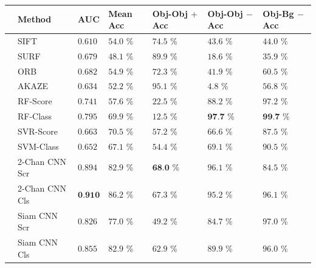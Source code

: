 \begin{table}[t]
	\forcerectofloat
	\centering
	
	\begin{tabular}{lllllll}
		\hline 
		& Method 	& AUC	 	& Mean Acc & Obj-Obj $+$ Acc 	& Obj-Obj $-$ Acc 	& Obj-Bg $-$ Acc\\ 
		\hline 
		& SIFT	& $0.610$ 	& $54.0 $ \% & $74.5 $ \% 		&  $43.6 $ \%			&  $44.0 $ \% \\
		& SURF	& $0.679$	& $48.1 $ \% & $89.9 $ \% 		&  $18.6 $ \%			&  $35.9 $ \% \\
		& ORB	& $0.682$	& $54.9 $ \% & $72.3 $ \% 		&  $41.9 $ \%			&  $60.5 $ \% \\
		& AKAZE	& $0.634$	& $52.2 $ \% & $95.1 $ \% 		&  $4.8 $ \%				&  $56.8 $ \% \\
		\hline
		
		\multirow{6}{*}{\rotatebox{90}{Different}}& RF-Score	& $0.741$	& $57.6 $ \% & $22.5 $ \% 		&  $88.2 $ \%				&  $97.2 $ \% \\
		& RF-Class	& $0.795$	& $69.9 $ \% & $12.5 $ \% 		&  $\textbf{97.7} $ \%				&  $\textbf{99.7} $ \% \\
		\cline{2-7}
		& SVR-Score	& $0.663$	& $70.5 $ \% & $57.2 $ \% 		&  $66.6 $ \%				&  $87.5 $ \% \\
		& SVM-Class	& $0.652$	& $67.1 $ \% & $54.4 $ \% 		&  $69.1 $ \%				&  $90.5 $ \% \\
		\cline{2-7}		
		& 2-Chan CNN Scr & $0.894$	& $82.9 $ \% & $\textbf{68.0} $ \% &  $96.1 $ \%				&  $84.5 $ \% \\
		& 2-Chan CNN Cls & $\textbf{0.910}$	& $86.2 $ \% & $67.3 $ \% &  $95.2 $ \%				&  $96.1 $ \% \\
		\cline{2-7}
		& Siam CNN Scr & $0.826$	& $77.0 $ \% & $49.2 $ \% &  $84.7 $ \%				&  $97.0 $ \% \\
		& Siam CNN Cls & $0.855$	& $82.9 $ \% & $62.9 $ \% &  $89.9 $ \%				&  $96.0 $ \% \\
		\hline
		

\end{tabular}
\end{table}

